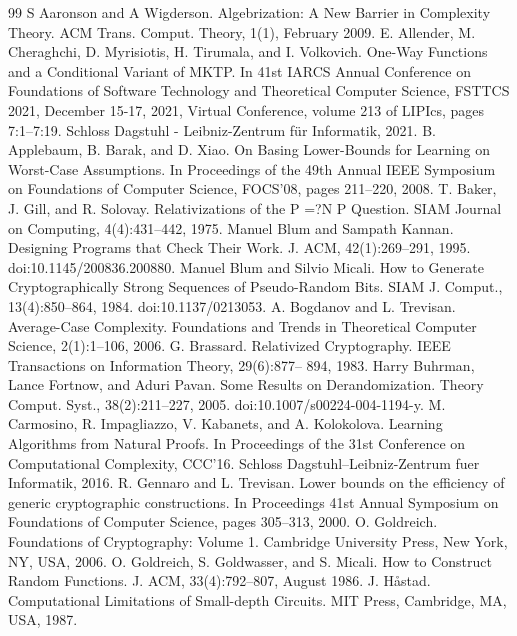 \begin{thebibliography}{99}
 S Aaronson and A Wigderson. Algebrization: A New Barrier in Complexity Theory. ACM Trans. Comput. Theory, 1(1), February 2009.
 E. Allender, M. Cheraghchi, D. Myrisiotis, H. Tirumala, and I. Volkovich. One-Way Functions and a Conditional Variant of MKTP. In 41st IARCS Annual Conference on Foundations of Software Technology and Theoretical Computer Science, FSTTCS 2021, December 15-17, 2021, Virtual Conference, volume 213 of LIPIcs, pages 7:1–7:19. Schloss Dagstuhl - Leibniz-Zentrum für Informatik, 2021.
 B. Applebaum, B. Barak, and D. Xiao. On Basing Lower-Bounds for Learning on Worst-Case Assumptions. In Proceedings of the 49th Annual IEEE Symposium on Foundations of Computer Science, FOCS’08, pages 211–220, 2008.
 T. Baker, J. Gill, and R. Solovay. Relativizations of the P =?N P Question. SIAM Journal on Computing, 4(4):431–442, 1975.
 Manuel Blum and Sampath Kannan. Designing Programs that Check Their Work. J. ACM, 42(1):269–291, 1995. doi:10.1145/200836.200880.
 Manuel Blum and Silvio Micali. How to Generate Cryptographically Strong Sequences of Pseudo-Random Bits. SIAM J. Comput., 13(4):850–864, 1984. doi:10.1137/0213053.
 A. Bogdanov and L. Trevisan. Average-Case Complexity. Foundations and Trends in Theoretical Computer Science, 2(1):1–106, 2006.
 G. Brassard. Relativized Cryptography. IEEE Transactions on Information Theory, 29(6):877– 894, 1983.
 Harry Buhrman, Lance Fortnow, and Aduri Pavan. Some Results on Derandomization. Theory Comput. Syst., 38(2):211–227, 2005. doi:10.1007/s00224-004-1194-y.
 M. Carmosino, R. Impagliazzo, V. Kabanets, and A. Kolokolova. Learning Algorithms from Natural Proofs. In Proceedings of the 31st Conference on Computational Complexity, CCC’16. Schloss Dagstuhl–Leibniz-Zentrum fuer Informatik, 2016.
 R. Gennaro and L. Trevisan. Lower bounds on the efficiency of generic cryptographic constructions. In Proceedings 41st Annual Symposium on Foundations of Computer Science, pages 305–313, 2000.
 O. Goldreich. Foundations of Cryptography: Volume 1. Cambridge University Press, New York, NY, USA, 2006.
 O. Goldreich, S. Goldwasser, and S. Micali. How to Construct Random Functions. J. ACM, 33(4):792–807, August 1986.
 J. Håstad. Computational Limitations of Small-depth Circuits. MIT Press, Cambridge, MA, USA, 1987.

\end{thebibliography}
